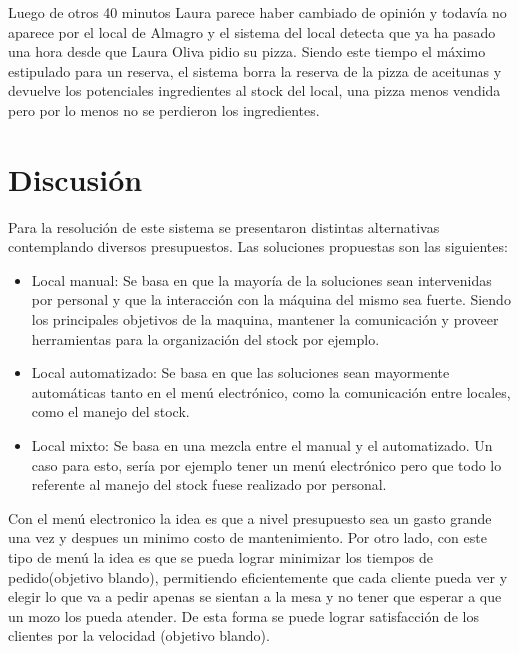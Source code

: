\documentclass[a4paper,10pt]{article}
\begin{document}
Luego de otros 40 minutos Laura parece haber cambiado de opini\'on y todav\'ia no aparece por el local de Almagro y
el sistema del local detecta que ya ha pasado una hora desde que Laura Oliva pidio su pizza. Siendo este
tiempo el m\'aximo estipulado para un reserva, el sistema borra la reserva de la pizza de aceitunas y devuelve los potenciales ingredientes
al stock del local, una pizza menos vendida pero por lo menos no se perdieron los ingredientes.



\newpage


\section*{Discusi\'on}

Para la resoluci\'on de este sistema se presentaron distintas alternativas contemplando diversos presupuestos. Las soluciones propuestas son las siguientes:
\begin{itemize}
\item Local manual: Se basa en que la mayor\'ia de la soluciones sean intervenidas por personal y que la interacci\'on con la m\'aquina del mismo sea fuerte.
Siendo los principales objetivos de la maquina, mantener la comunicaci\'on y proveer herramientas para la organizaci\'on del stock por ejemplo.
\item Local automatizado: Se basa en que las soluciones sean mayormente autom\'aticas tanto en el men\'u electr\'onico, como la comunicaci\'on entre locales, como el manejo del stock.
\item Local mixto: Se basa en una mezcla entre el manual y el automatizado. Un caso para esto, ser\'ia por ejemplo tener un men\'u electr\'onico pero que todo lo referente al manejo del stock fuese realizado por personal.
\end{itemize}


Con el men\'u electronico la idea es que a nivel presupuesto sea un gasto grande una vez y despues un minimo costo de mantenimiento. 
Por otro lado, con este tipo de men\'u la idea es que se pueda lograr minimizar los tiempos de pedido(objetivo blando), 
permitiendo eficientemente que cada cliente pueda ver y elegir lo que va a pedir apenas se sientan a la mesa y no tener que esperar a 
que un mozo los pueda atender. De esta forma se puede lograr satisfacci\'on de los clientes por la velocidad (objetivo blando). 
\end{document}
